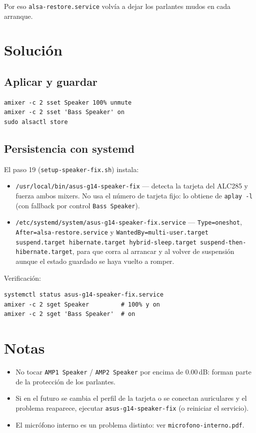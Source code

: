 \documentclass[12pt,a4paper]{article}
\begin{document}
Por eso \texttt{alsa-restore.service} volvía a dejar los parlantes mudos en
cada arranque.

\section{Solución}

\subsection*{Aplicar y guardar}

\begin{lstlisting}[style=bash]
amixer -c 2 sset Speaker 100% unmute
amixer -c 2 sset 'Bass Speaker' on
sudo alsactl store
\end{lstlisting}

\subsection*{Persistencia con systemd}

El paso 19 (\texttt{setup-speaker-fix.sh}) instala:

\begin{itemize}[nosep]
  \item \texttt{/usr/local/bin/asus-g14-speaker-fix} — detecta la tarjeta del
        ALC285 y fuerza ambos mixers. No usa el número de tarjeta fijo: lo
        obtiene de \texttt{aplay -l} (con fallback por control
        \texttt{Bass Speaker}).
  \item \texttt{/etc/systemd/system/asus-g14-speaker-fix.service} —
        \texttt{Type=oneshot}, \texttt{After=alsa-restore.service} y
        \texttt{WantedBy=multi-user.target suspend.target hibernate.target
        hybrid-sleep.target suspend-then-hibernate.target}, para que corra al
        arrancar y al volver de suspensión aunque el estado guardado se haya
        vuelto a romper.
\end{itemize}

Verificación:

\begin{lstlisting}[style=bash]
systemctl status asus-g14-speaker-fix.service
amixer -c 2 sget Speaker         # 100% y on
amixer -c 2 sget 'Bass Speaker'  # on
\end{lstlisting}

\section{Notas}

\begin{itemize}[nosep]
  \item No tocar \texttt{AMP1 Speaker} / \texttt{AMP2 Speaker} por encima de
        0.00\,dB: forman parte de la protección de los parlantes.
  \item Si en el futuro se cambia el perfil de la tarjeta o se conectan
        auriculares y el problema reaparece, ejecutar
        \texttt{asus-g14-speaker-fix} (o reiniciar el servicio).
  \item El micrófono interno es un problema distinto: ver
        \texttt{microfono-interno.pdf}.
\end{itemize}
\end{document}
